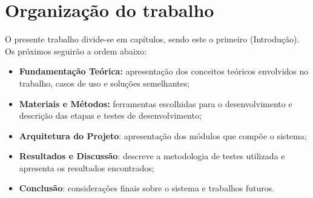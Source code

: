 \section{Organização do trabalho}
O presente trabalho divide-se em capítulos, sendo este o primeiro (Introdução). Os próximos seguirão a ordem abaixo:

\begin{itemize}
  \item \textbf{Fundamentação Teórica:} apresentação dos conceitos teóricos envolvidos no trabalho, casos de uso e soluções semelhantes;
  \item \textbf{Materiais e Métodos:} ferramentas escolhidas para o desenvolvimento e descrição das etapas e testes de desenvolvimento;
  \item \textbf{Arquitetura do Projeto}: apresentação dos módulos que compõe o sistema;
  \item \textbf{Resultados e Discussão}: descreve a metodologia de testes utilizada e apresenta os resultados encontrados;
  \item \textbf{Conclusão}: considerações finais sobre o sistema e trabalhos futuros.
\end{itemize}

